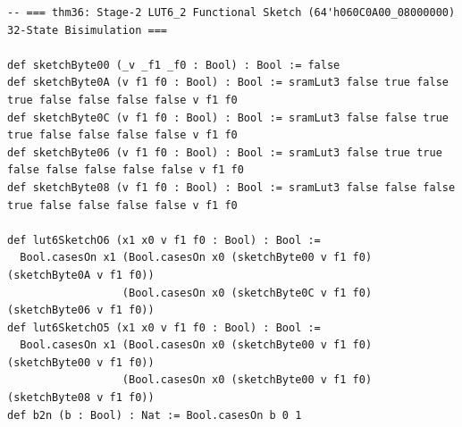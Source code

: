 \documentclass[10pt,twocolumn]{article}
\theoremstyle{spectralthm}
\begin{document}
\begin{lstlisting}[language=Lean4,caption={Standalone Pure Init.Prelude Term-Mode Lean 4 Expansion (thm30--thm37, v1.1.0, 0 sorry, 0 axioms).},label={lst:lean_v110}]
-- === thm36: Stage-2 LUT6_2 Functional Sketch (64'h060C0A00_08000000) 32-State Bisimulation ===

def sketchByte00 (_v _f1 _f0 : Bool) : Bool := false
def sketchByte0A (v f1 f0 : Bool) : Bool := sramLut3 false true false true false false false false v f1 f0
def sketchByte0C (v f1 f0 : Bool) : Bool := sramLut3 false false true true false false false false v f1 f0
def sketchByte06 (v f1 f0 : Bool) : Bool := sramLut3 false true true false false false false false v f1 f0
def sketchByte08 (v f1 f0 : Bool) : Bool := sramLut3 false false false true false false false false v f1 f0

def lut6SketchO6 (x1 x0 v f1 f0 : Bool) : Bool :=
  Bool.casesOn x1 (Bool.casesOn x0 (sketchByte00 v f1 f0) (sketchByte0A v f1 f0))
                  (Bool.casesOn x0 (sketchByte0C v f1 f0) (sketchByte06 v f1 f0))
def lut6SketchO5 (x1 x0 v f1 f0 : Bool) : Bool :=
  Bool.casesOn x1 (Bool.casesOn x0 (sketchByte00 v f1 f0) (sketchByte00 v f1 f0))
                  (Bool.casesOn x0 (sketchByte00 v f1 f0) (sketchByte08 v f1 f0))
def b2n (b : Bool) : Nat := Bool.casesOn b 0 1


\end{lstlisting}
\end{document}
